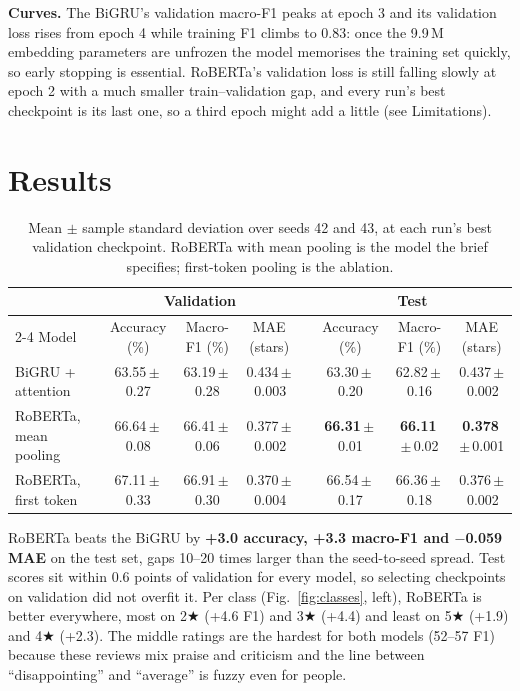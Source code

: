 \documentclass[10pt,a4paper]{article}
\newcommand{\st}[1]{#1$\bigstar$}
\newcommand{\pmstd}[2]{#1\,{\scriptsize$\pm$\,#2}}
\begin{document}
\textbf{Curves.} The BiGRU's validation macro-F1 peaks at epoch 3 and its validation loss rises from epoch 4 while
training F1 climbs to 0.83: once the 9.9\,M embedding parameters are unfrozen the model memorises the training set
quickly, so early stopping is essential. RoBERTa's validation loss is still falling slowly at epoch 2 with a much
smaller train--validation gap, and every run's best checkpoint is its last one, so a third epoch might add a little
(see Limitations).

\section{Results}

\begin{table}[!htbp]
\centering\small
\begin{tabular}{@{}lccccccc@{}}
\toprule
 & \multicolumn{3}{c}{\textbf{Validation}} & & \multicolumn{3}{c}{\textbf{Test}} \\
\cmidrule{2-4}\cmidrule{6-8}
Model & Accuracy (\%) & Macro-F1 (\%) & MAE (stars) & & Accuracy (\%) & Macro-F1 (\%) & MAE (stars) \\
\midrule
BiGRU + attention      & \pmstd{63.55}{0.27} & \pmstd{63.19}{0.28} & \pmstd{0.434}{0.003} & & \pmstd{63.30}{0.20} & \pmstd{62.82}{0.16} & \pmstd{0.437}{0.002} \\
RoBERTa, mean pooling  & \pmstd{66.64}{0.08} & \pmstd{66.41}{0.06} & \pmstd{0.377}{0.002} & & \pmstd{\textbf{66.31}}{0.01} & \pmstd{\textbf{66.11}}{0.02} & \pmstd{\textbf{0.378}}{0.001} \\
RoBERTa, first token   & \pmstd{67.11}{0.33} & \pmstd{66.91}{0.30} & \pmstd{0.370}{0.004} & & \pmstd{66.54}{0.17} & \pmstd{66.36}{0.18} & \pmstd{0.376}{0.002} \\
\bottomrule
\end{tabular}
\caption{Mean $\pm$ sample standard deviation over seeds 42 and 43, at each run's best validation checkpoint.
RoBERTa with mean pooling is the model the brief specifies; first-token pooling is the ablation.}
\label{tab:results}
\end{table}

RoBERTa beats the BiGRU by \textbf{+3.0 accuracy, +3.3 macro-F1 and $-$0.059 MAE} on the test set, gaps 10--20 times
larger than the seed-to-seed spread. Test scores sit within 0.6 points of validation for every model, so selecting
checkpoints on validation did not overfit it. Per class (Fig.~\ref{fig:classes}, left), RoBERTa is better
everywhere, most on \st{2} (+4.6 F1) and \st{3} (+4.4) and least on \st{5} (+1.9) and \st{4} (+2.3). The middle
ratings are the hardest for both models (52--57 F1) because these reviews mix praise and criticism and the line
between ``disappointing'' and ``average'' is fuzzy even for people.
\end{document}
